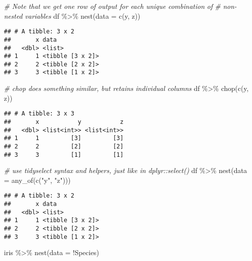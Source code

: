 \documentclass[
]{book}
\newenvironment{Shaded}{\begin{snugshade}}{\end{snugshade}}
\newcommand{\AttributeTok}[1]{\textcolor[rgb]{0.77,0.63,0.00}{#1}}
\newcommand{\CommentTok}[1]{\textcolor[rgb]{0.56,0.35,0.01}{\textit{#1}}}
\newcommand{\FunctionTok}[1]{\textcolor[rgb]{0.00,0.00,0.00}{#1}}
\newcommand{\NormalTok}[1]{#1}
\newcommand{\SpecialCharTok}[1]{\textcolor[rgb]{0.00,0.00,0.00}{#1}}
\newcommand{\StringTok}[1]{\textcolor[rgb]{0.31,0.60,0.02}{#1}}
\begin{document}
\begin{Shaded}
\begin{Highlighting}[]
\CommentTok{\# Note that we get one row of output for each unique combination of}
\CommentTok{\# non{-}nested variables}
\NormalTok{df }\SpecialCharTok{\%\textgreater{}\%} 
  \FunctionTok{nest}\NormalTok{(}\AttributeTok{data =} \FunctionTok{c}\NormalTok{(y, z))}
\end{Highlighting}
\end{Shaded}

\begin{verbatim}
## # A tibble: 3 x 2
##       x data            
##   <dbl> <list>          
## 1     1 <tibble [3 x 2]>
## 2     2 <tibble [2 x 2]>
## 3     3 <tibble [1 x 2]>
\end{verbatim}

\begin{Shaded}
\begin{Highlighting}[]
\CommentTok{\# chop does something similar, but retains individual columns}
\NormalTok{df }\SpecialCharTok{\%\textgreater{}\%} 
  \FunctionTok{chop}\NormalTok{(}\FunctionTok{c}\NormalTok{(y, z))}
\end{Highlighting}
\end{Shaded}

\begin{verbatim}
## # A tibble: 3 x 3
##       x           y           z
##   <dbl> <list<int>> <list<int>>
## 1     1         [3]         [3]
## 2     2         [2]         [2]
## 3     3         [1]         [1]
\end{verbatim}

\begin{Shaded}
\begin{Highlighting}[]
\CommentTok{\# use tidyselect syntax and helpers, just like in dplyr::select()}
\NormalTok{df }\SpecialCharTok{\%\textgreater{}\%} 
  \FunctionTok{nest}\NormalTok{(}\AttributeTok{data =} \FunctionTok{any\_of}\NormalTok{(}\FunctionTok{c}\NormalTok{(}\StringTok{"y"}\NormalTok{, }\StringTok{"z"}\NormalTok{)))}
\end{Highlighting}
\end{Shaded}

\begin{verbatim}
## # A tibble: 3 x 2
##       x data            
##   <dbl> <list>          
## 1     1 <tibble [3 x 2]>
## 2     2 <tibble [2 x 2]>
## 3     3 <tibble [1 x 2]>
\end{verbatim}

\begin{Shaded}
\begin{Highlighting}[]
\NormalTok{iris }\SpecialCharTok{\%\textgreater{}\%} 
  \FunctionTok{nest}\NormalTok{(}\AttributeTok{data =} \SpecialCharTok{!}\NormalTok{Species)}
\end{Highlighting}
\end{Shaded}
\end{document}
